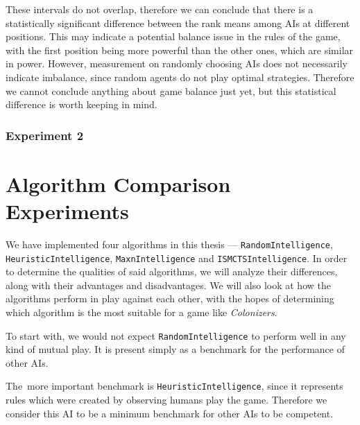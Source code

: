 These intervals do not overlap, therefore we can conclude that there is a statistically
significant difference between the rank means among AIs at different positions. This may
indicate a potential balance issue in the rules of the game, with the first position
being more powerful than the other ones, which are similar in power. However,
measurement on randomly choosing AIs does not necessarily indicate imbalance, since
random agents do not play optimal strategies. Therefore we cannot conclude anything
about game balance just yet, but this statistical difference is worth keeping in mind.

\subsubsection{Experiment 2}

\section{Algorithm Comparison Experiments}

We have implemented four algorithms in this thesis --- \texttt{RandomIntelligence},
\texttt{HeuristicIntelligence}, \texttt{MaxnIntelligence} and \texttt{ISMCTSIntelligence}.
In order to determine the qualities of said algorithms, we will analyze their differences,
along with their advantages and disadvantages. We will also look at how the algorithms
perform in play against each other, with the hopes of determining which algorithm
is the most suitable for a game like \emph{Colonizers}.

To start with, we would not expect \texttt{RandomIntelligence} to perform well in any
kind of mutual play. It is present simply as a benchmark for the performance of
other AIs.

The~more important benchmark is \texttt{HeuristicIntelligence}, since it represents
rules which were created by observing humans play the game. Therefore we consider this
AI to be a minimum benchmark for other AIs to be competent.

